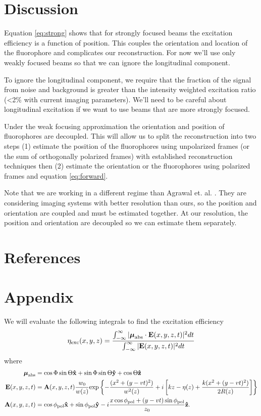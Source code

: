 \documentclass[11pt]{article}
\begin{document}
\section{Discussion}
Equation \ref{eq:strong} shows that for strongly focused beams the excitation
efficiency is a function of position. This couples the orientation and location
of the fluorophore and complicates our reconstruction. For now we'll use only
weakly focused beams so that we can ignore the longitudinal component.

To ignore the longitudinal component, we require that the fraction of the signal
from noise and background is greater than the intensity weighted excitation
ratio (<2\% with current imaging parameters). We'll need to be careful about
longitudinal excitation if we want to use beams that are more strongly focused.

Under the weak focusing approximation the orientation and position of
fluorophores are decoupled. This will allow us to split the reconstruction into
two steps (1) estimate the position of the fluorophores using unpolarized frames
(or the sum of orthogonally polarized frames) with established reconstruction
techniques then (2) estimate the orientation or the fluorophores using polarized
frames and equation \ref{eq:forward}.

Note that we are working in a different regime than Agrawal et. al. \cite{agrawal}. They
are considering imaging systems with better resolution than ours, so the
position and orientation are coupled and must be estimated together. At our
resolution, the position and orientation are decoupled so we can estimate them
separately.

\section{References}
\setlength{}
\printbibliography[heading=none]
\pagebreak

\section{Appendix}
We will evaluate the following integrals to find the excitation efficiency
\begin{align}
  \eta_{\text{exc}}(x,y,z) = \frac{\int_{-\infty}^{\infty}|\boldsymbol{\mu}_{\text{abs}} \cdot \mathbf{E}(x,y,z,t)|^2dt}{\int_{-\infty}^{\infty}|\mathbf{E}(x,y,z,t)|^2dt}\label{eq:excitation}
\end{align}
where
\begin{align}
  \boldsymbol{\mu}_{\text{abs}} &= \cos\Phi\sin\Theta\mathbf{\hat{x}} + \sin\Phi\sin\Theta\mathbf{\hat{y}} + \cos\Theta\mathbf{\hat{z}}\\
  \mathbf{E}(x,y,z,t) &= \mathbf{A}(x,y,z,t)\frac{w_0}{w(z)}\text{exp}\left\{{-\frac{(x^2+(y-vt)^2)}{w^2(z)}}+i\left[kz - \eta(z) + \frac{k(x^2+(y-vt)^2)}{2R(z)}\right]\right\}\\
  \mathbf{A}(x,y,z,t) &= \cos\phi_{\text{pol}}\mathbf{\hat{x}} + \sin\phi_{\text{pol}}\mathbf{\hat{y}} - i\frac{x\cos\phi_{\text{pol}} + (y - vt)\sin\phi_{\text{pol}}}{z_0}\mathbf{\hat{z}}.\label{eq:scanned_jones}
\end{align}
\end{document}

